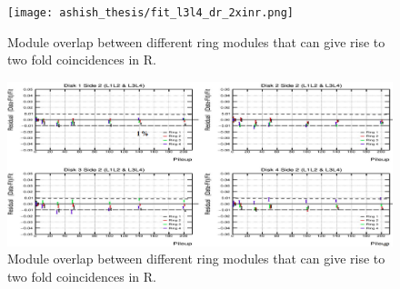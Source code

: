 \begin{figure}[!htp]
\centering
\texttt{[image: ashish\_thesis/fit\_l3l4\_dr\_2xinr.png]}
\caption{%
   Module overlap between different ring modules that can give rise to two fold coincidences in R.
}
\label{fig:cluster_ring}
\end{figure}



\begin{figure}[!htp]
\centering
\includegraphics[width=1\textwidth]{ashish_thesis/residuaL_L1L2_L3L4_2xinr.png}
\caption{%
   Module overlap between different ring modules that can give rise to two fold coincidences in R.
}
\label{fig:cluster_ring}
\end{figure}

